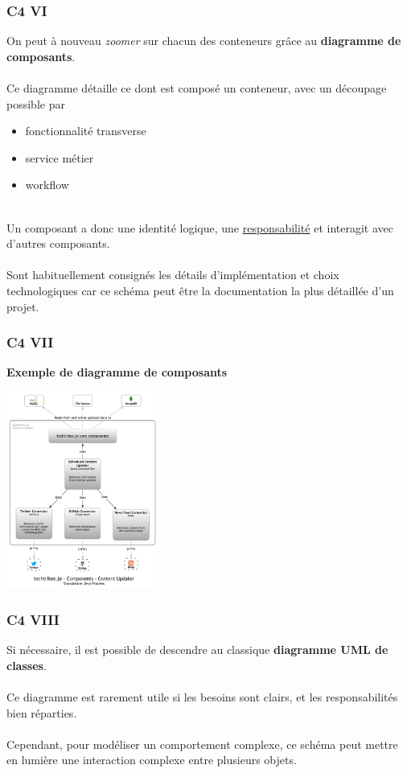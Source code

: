 \begin{frame}
	\frametitle{C4 VI}
    
    On peut \`{a} nouveau \textit{zoomer} sur chacun des conteneurs gr\^{a}ce au \textbf{diagramme de composants}.
    \\~\\
    Ce diagramme d\'{e}taille ce dont est compos\'{e} un conteneur, avec un d\'{e}coupage possible par
    \begin{itemize}
    	\item fonctionnalit\'{e} transverse
        \item service m\'{e}tier
        \item workflow
    \end{itemize}
    ~\\
    Un composant a donc une identit\'{e} logique, une \underline{responsabilit\'{e}} et interagit avec d'autres composants.
    \\~\\
    Sont habituellement consign\'{e}s les d\'{e}tails d'impl\'{e}mentation et choix technologiques car ce sch\'{e}ma peut \^{e}tre la documentation la plus d\'{e}taill\'{e}e d'un projet.
\end{frame}

\begin{frame}
	\frametitle{C4 VII}

    \textbf{Exemple de diagramme de composants}\\
    \centerline{\includegraphics[width=5cm]{img/component_diagram.png}}
\end{frame}

\begin{frame}
	\frametitle{C4 VIII}
    Si n\'{e}cessaire, il est possible de descendre au classique \textbf{diagramme UML de classes}.
    \\~\\
    Ce diagramme est rarement utile si les besoins sont clairs, et les responsabilit\'{e}s bien r\'{e}parties.
    \\~\\
    Cependant, pour mod\'{e}liser un comportement complexe, ce sch\'{e}ma peut mettre en lumi\`{e}re une interaction complexe entre plusieurs objets.
\end{frame}

